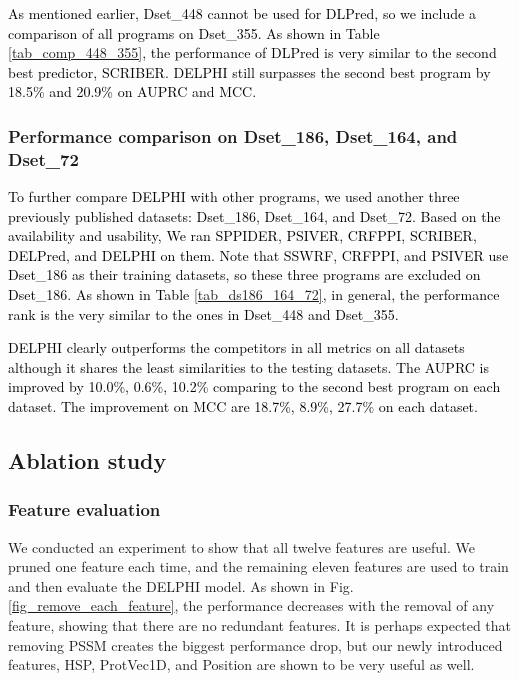 \documentclass{bioinfo}
\newcommand{\myColor}{black}
\begin{document}
\textcolor{\myColor}{As mentioned earlier, Dset\_448 cannot be used for DLPred, so we include a comparison of all programs on Dset\_355. As shown in Table \ref{tab_comp_448_355}, the performance of DLPred is very similar to the second best predictor, SCRIBER.  DELPHI still surpasses the second best program by 18.5\% and 20.9\% on AUPRC and MCC.  }

\subsubsection{Performance comparison on Dset\_186, Dset\_164, and Dset\_72}\label{section_four_tests}
\textcolor{\myColor}{To further compare DELPHI with other programs, we used another three previously published datasets: Dset\_186, Dset\_164, and Dset\_72. Based on the availability and usability, We ran SPPIDER, PSIVER, CRFPPI, SCRIBER, DELPred, and DELPHI on them. Note that SSWRF, CRFPPI, and PSIVER use Dset\_186 as their training datasets, so these three programs are excluded on Dset\_186. As shown in Table \ref{tab_ds186_164_72}, in general, the performance rank is the very similar to the ones in Dset\_448 and Dset\_355.}



\textcolor{\myColor}{
DELPHI clearly outperforms the competitors in all metrics on all datasets although it shares the least similarities to the testing datasets.  The AUPRC is improved by 10.0\%, 0.6\%, 10.2\% comparing to the second best program on each dataset. The improvement on MCC are 18.7\%, 8.9\%, 27.7\% on each dataset. 
}

\subsection{Ablation study}

\subsubsection{Feature evaluation}
We conducted an experiment to show that all twelve features are useful. We pruned one feature each time, and the remaining eleven features are used to train and then evaluate the DELPHI model. As shown in Fig. \ref{fig_remove_each_feature}, the performance decreases with the removal of any feature, showing that there are no redundant features. It is perhaps expected that  removing PSSM creates the biggest performance drop, but our newly introduced features, HSP, ProtVec1D, and Position are shown to be  very useful as well. 
\end{document}
